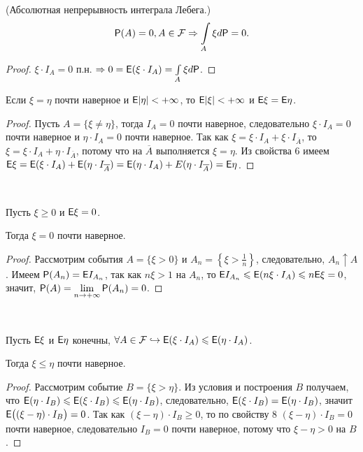 \begin{consequence} (Абсолютная непрерывность интеграла Лебега.)
    $$ \P(A) = 0, A \in \F \Rightarrow \int\limits_{A} \xi d\P = 0. $$
    \begin{proof}
        $\xi \cdot I_A = 0$ п.н. $\Rightarrow 0 = \E(\xi \cdot I_A) = \int\limits_A\xi d\P$.
    \end{proof}
\end{consequence}

\begin{property}
	Если $\xi = \eta$ почти наверное и $\E | \eta| < +\infty$, то $\E | \xi| < +\infty$ и $\E \xi = \E \eta$.
	\begin{proof}
		Пусть $A = \{ \xi \neq \eta \}$, тогда $I_A = 0$ почти наверное, следовательно $\xi \cdot I_A = 0$ почти наверное и $\eta \cdot I_A = 0$ почти наверное. Так как $\xi = \xi \cdot I_A + \xi \cdot I_{\overline A}$, то $\xi = \xi \cdot I_A + \eta \cdot I_{\overline A}$, потому что на $\overline A$ выполняется $\xi = \eta$. Из свойства 6 имеем $\E \xi = \E ( \xi \cdot I_A ) + \E (\eta \cdot I_{\overline A} ) = \E ( \eta \cdot I_A) + E ( \eta \cdot I_{\overline A} ) = \E \eta$. 
	\end{proof}
\end{property}

\begin{property}~

	Пусть $\xi \geqslant 0$ и $\E \xi = 0$.
	
	Тогда $\xi = 0$ почти наверное.
	\begin{proof}
		Рассмотрим события $A = \{ \xi > 0 \}$ и $A_n = \left\{ \xi > \frac{1}{n} \right\} $, следовательно, $A_n \uparrow A$. Имеем $\P (A_n) = \E I_{A_n}$, так как $n\xi > 1$ на $A_n$, то  $\E I_{A_n} \leqslant \E (n\xi \cdot I_A) \leqslant n \E \xi = 0$, значит, $\P(A) = \lim\limits_{n \rightarrow +\infty} \P (A_n) = 0$.
	\end{proof}
\end{property}

\begin{property}~

	Пусть $\E \xi$ и $\E \eta$ конечны, $\forall A \in \F \hookrightarrow \E (\xi \cdot I_A) \leqslant \E ( \eta \cdot I_A)$.
	
	Тогда  $\xi \leqslant \eta$ почти наверное.
	\begin{proof}
		Рассмотрим событие $B = \{ \xi > \eta \}$. Из условия и построения $B$ получаем, что $\E (\eta \cdot I_B) \leqslant \E (\xi \cdot I_B) \leqslant \E (\eta \cdot I_B)$, следовательно, $\E( \xi \cdot I_B) = \E(\eta \cdot I_B)$, значит $\E \big( (\xi - \eta) \cdot I_B \big) = 0$. Так как $(\xi - \eta) \cdot I_B \geqslant 0$, то по свойству 8 $(\xi - \eta) \cdot I_B = 0$ почти наверное, следовательно $I_B = 0$ почти наверное, потому что $\xi- \eta > 0$ на $B$.
	\end{proof}
\end{property}

